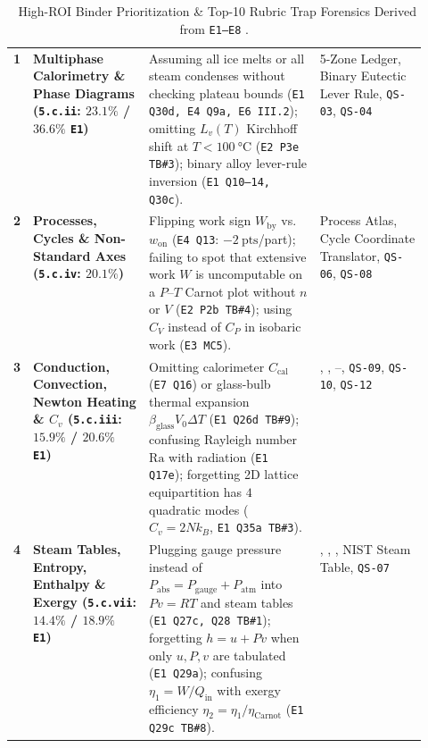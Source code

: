 
\begin{table}[h!]
\centering
\caption{\REC\ High-ROI Binder Prioritization \& Top-10 Rubric Trap Forensics Derived from \texttt{E1--E8} .}\label{tab:22:rec-traps}
\footnotesize
\setlength{\tabcolsep}{3.0pt}
\renewcommand{\arraystretch}{1.12}
\begin{tabularx}{\linewidth}{@{}l L{0.28\linewidth} X L{0.26\linewidth}@{}}
\toprule
{} &  &  &  \\
\midrule
\textbf{1} & \textbf{Multiphase Calorimetry \& Phase Diagrams (\texttt{5.c.ii}: $23.1\%$ / $36.6\%$ \texttt{E1})} & Assuming all ice melts or all steam condenses without checking plateau bounds (\texttt{E1 Q30d, E4 Q9a, E6 III.2}); omitting $L_v(T)$ Kirchhoff shift at $T < \SI{100}{\celsius}$ (\texttt{E2 P3e TB\#3}); binary alloy lever-rule inversion (\texttt{E1 Q10--14, Q30c}). &  5-Zone Ledger,  Binary Eutectic Lever Rule, \texttt{QS-03}, \texttt{QS-04} \\
\textbf{2} & \textbf{Processes, Cycles \& Non-Standard Axes (\texttt{5.c.iv}: $20.1\%$)} & Flipping work sign $W_{\mathrm{by}}$ vs.\ $w_{\mathrm{on}}$ (\texttt{E4 Q13}: $-\SI{2}{\text{pts}}$/part); failing to spot that extensive work $W$ is uncomputable on a $P$--$T$ Carnot plot without $n$ or $V$ (\texttt{E2 P2b TB\#4}); using $C_V$ instead of $C_P$ in isobaric work (\texttt{E3 MC5}). &  Process Atlas,  Cycle Coordinate Translator, \texttt{QS-06}, \texttt{QS-08} \\
\textbf{3} & \textbf{Conduction, Convection, Newton Heating \& $C_v$ (\texttt{5.c.iii}: $15.9\%$ / $20.6\%$ \texttt{E1})} & Omitting calorimeter $C_{\mathrm{cal}}$ (\texttt{E7 Q16}) or glass-bulb thermal expansion $\beta_{\mathrm{glass}}V_0\Delta T$ (\texttt{E1 Q26d TB\#9}); confusing Rayleigh number $\mathrm{Ra}$ with radiation (\texttt{E1 Q17e}); forgetting 2D lattice equipartition has $4$ quadratic modes ($C_v = 2Nk_B$, \texttt{E1 Q35a TB\#3}). & , , --, \texttt{QS-09}, \texttt{QS-10}, \texttt{QS-12} \\
\textbf{4} & \textbf{Steam Tables, Entropy, Enthalpy \& Exergy (\texttt{5.c.vii}: $14.4\%$ / $18.9\%$ \texttt{E1})} & Plugging gauge pressure instead of $P_{\mathrm{abs}} = P_{\mathrm{gauge}} + P_{\mathrm{atm}}$ into $Pv=RT$ and steam tables (\texttt{E1 Q27c, Q28 TB\#1}); forgetting $h = u + Pv$ when only $u, P, v$ are tabulated (\texttt{E1 Q29a}); confusing $\eta_1 = W/Q_{\mathrm{in}}$ with exergy efficiency $\eta_2 = \eta_1/\eta_{\mathrm{Carnot}}$ (\texttt{E1 Q29c TB\#8}). & , , ,  NIST Steam Table, \texttt{QS-07} \\

\end{tabularx}
\end{table}
